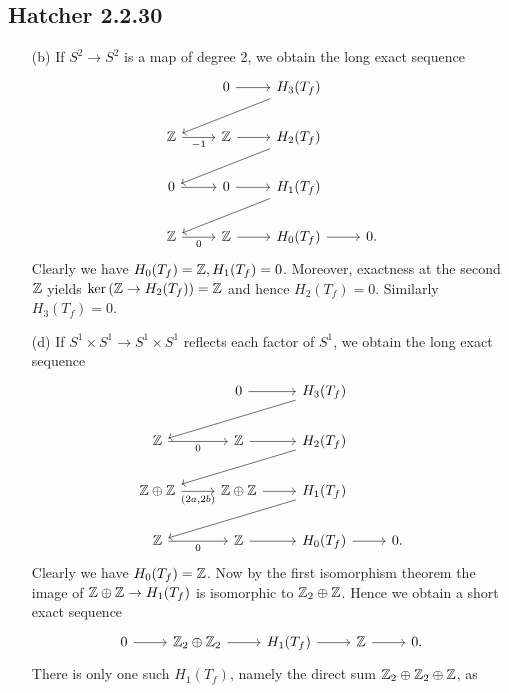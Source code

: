 \documentclass{../mathnotes}
\begin{document}
\subsection*{Hatcher 2.2.30}
\begin{enumerate}[(a)]
    \item[(b)] If $S^2\to S^2$ is a map of degree 2, we obtain the long exact sequence
        \begin{equation*}
            \begin{tikzcd}
                \;&0\ar{r} & H_3(T_f)\ar{dll}\\
                \Z\ar[swap]{r}{-1} & \Z\ar{r} & H_2(T_f)\ar{dll}\\
                0\ar{r} & 0\ar{r} & H_1(T_f)\ar{dll}\\
                \Z\ar[swap]{r}{0} & \Z\ar{r} & H_0(T_f)\ar{r} & 0.
            \end{tikzcd}
        \end{equation*}
        Clearly we have $H_0(T_f)=\mathbb{Z},H_1(T_f)=0$. Moreover, exactness at the second $\mathbb{Z}$ yields
        $\ker\left( \mathbb{Z}\to H_2(T_f) \right)=\mathbb{Z}$ and hence $H_2(T_f)=0.$ Similarly $H_3(T_f)=0$.
    \item[(d)] If $S^1\times S^1\to S^1\times S^1$ reflects each factor of $S^1$, we obtain the
        long exact sequence
        \begin{equation*}
            \begin{tikzcd}
                \;&0\ar{r} & H_3(T_f)\ar{dll}\\
                \Z\ar[swap]{r}{0} & \Z\ar{r} & H_2(T_f)\ar{dll}\\
                \Z\oplus\Z\ar[swap]{r}{(2a,2b)} & \Z\oplus\Z\ar{r} & H_1(T_f)\ar{dll}\\
                \Z\ar[swap]{r}{0} & \Z\ar{r} & H_0(T_f)\ar{r} & 0.
            \end{tikzcd}
        \end{equation*}
        Clearly we have $H_0(T_f)=\mathbb{Z}$. Now by the first isomorphism theorem the image of $\mathbb{Z}\oplus\mathbb{Z}\to H_1(T_f)$
        is isomorphic to $\mathbb{Z}_2\oplus\mathbb{Z}$. Hence we obtain a short exact sequence
        \begin{equation*}
            \begin{tikzcd}
                0\ar{r} & \Z_2\oplus\Z_2\ar{r} & H_1(T_f)\ar{r} & \Z\ar{r} & 0.
            \end{tikzcd}
        \end{equation*}
        There is only one such $H_1(T_f)$, namely the direct sum $\mathbb{Z}_2\oplus\mathbb{Z}_2\oplus\mathbb{Z}$, as

\end{enumerate}
\end{document}
